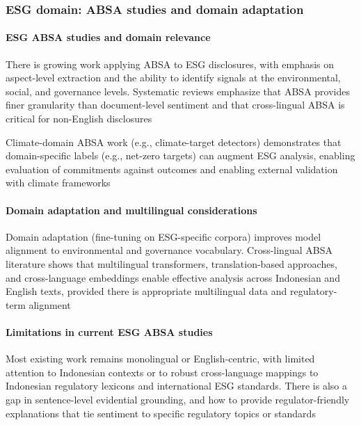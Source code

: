 \subsubsection{ESG domain: ABSA studies and domain adaptation}

\paragraph{ESG ABSA studies and domain relevance}

There is growing work applying ABSA to ESG disclosures, with emphasis on aspect-level extraction and the ability to identify signals at the environmental, social, and governance levels. Systematic reviews emphasize that ABSA provides finer granularity than document-level sentiment and that cross-lingual ABSA is critical for non-English disclosures \cite{10.1002/csr.70089,10.3390/math12193119,10.2139/ssrn.3738629,10.1111/eufm.12509}

Climate-domain ABSA work (e.g., climate-target detectors) demonstrates that domain-specific labels (e.g., net-zero targets) can augment ESG analysis, enabling evaluation of commitments against outcomes and enabling external validation with climate frameworks \cite{10.21203/rs.3.rs-3600821/v1,10.48550/arxiv.2510.01222,10.18653/v1/2023.emnlp-main.975,0.1108/dta-01-2024-0065}
\paragraph{Domain adaptation and multilingual considerations}

Domain adaptation (fine-tuning on ESG-specific corpora) improves model alignment to environmental and governance vocabulary. Cross-lingual ABSA literature shows that multilingual transformers, translation-based approaches, and cross-language embeddings enable effective analysis across Indonesian and English texts, provided there is appropriate multilingual data and regulatory-term alignment \cite{10.1016/j.inffus.2025.103073,10.1111/eufm.12509,10.48550/arxiv.2511.00024}
\paragraph{Limitations in current ESG ABSA studies}

Most existing work remains monolingual or English-centric, with limited attention to Indonesian contexts or to robust cross-language mappings to Indonesian regulatory lexicons and international ESG standards. There is also a gap in sentence-level evidential grounding, and how to provide regulator-friendly explanations that tie sentiment to specific regulatory topics or standards \cite{10.1002/csr.70089,10.2139/ssrn.3738629,10.1108/mf-01-2023-0020}

